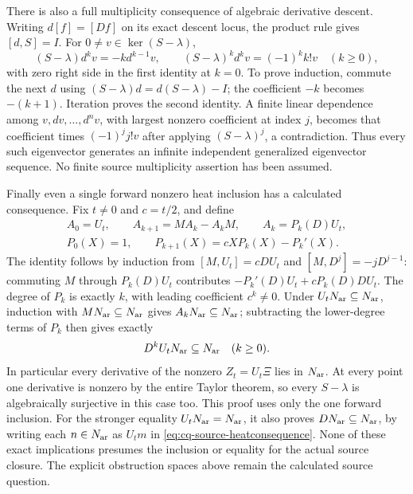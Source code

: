 There is also a full multiplicity consequence of algebraic derivative
descent. Writing $d[f]=[Df]$ on its exact descent locus, the product
rule gives $[d,S]=I$. For $0\ne v\in\ker(S-\lambda)$,
\begin{equation}\label{eq:cq-source-weylladder}
 (S-\lambda)d^kv=-k d^{k-1}v,
 \qquad (S-\lambda)^kd^kv=(-1)^k k!v\quad(k\geq0),
\end{equation}
with zero right side in the first identity at $k=0$.
To prove induction, commute the next $d$ using
$(S-\lambda)d=d(S-\lambda)-I$; the coefficient $-k$ becomes
$-(k+1)$. Iteration proves the second identity. A finite linear
dependence among $v,dv,\ldots,d^nv$, with largest nonzero
coefficient at index $j$, becomes that coefficient times
$(-1)^j j!v$ after applying $(S-\lambda)^j$, a contradiction.
Thus every such eigenvector generates an infinite independent
generalized eigenvector sequence. No finite source multiplicity
assertion has been assumed.

Finally even a single forward nonzero heat inclusion has a calculated
consequence. Fix $t\ne0$ and $c=t/2$, and define
\begin{equation}\label{eq:cq-source-heatcommutator}
 \begin{gathered}
 A_0=U_t,\qquad A_{k+1}=MA_k-A_kM,\qquad A_k=P_k(D)U_t,\\
 P_0(X)=1,\qquad P_{k+1}(X)=cX P_k(X)-P_k'(X).
 \end{gathered}
\end{equation}
The identity follows by induction from $[M,U_t]=cDU_t$ and
$[M,D^j]=-jD^{j-1}$: commuting $M$ through $P_k(D)U_t$
contributes $-P_k'(D)U_t+cP_k(D)DU_t$.
The degree of $P_k$ is exactly $k$, with leading coefficient
$c^k\ne0$. Under $U_tN_{\rm ar}\subseteq N_{\rm ar}$, induction with
$MN_{\rm ar}\subseteq N_{\rm ar}$ gives $A_kN_{\rm ar}\subseteq N_{\rm ar}$;
subtracting the lower-degree terms of $P_k$ then gives exactly
\begin{equation}\label{eq:cq-source-heatconsequence}
 D^kU_tN_{\rm ar}\subseteq N_{\rm ar}\quad(k\geq0).
\end{equation}
In particular every derivative of the nonzero $Z_t=U_t\Xi$ lies
in $N_{\rm ar}$. At every point one derivative is nonzero by the entire
Taylor theorem, so every $S-\lambda$ is algebraically surjective
in this case too. This proof uses only the one forward inclusion.
For the stronger equality $U_tN_{\rm ar}=N_{\rm ar}$, it also proves
$DN_{\rm ar}\subseteq N_{\rm ar}$, by writing each $n\in N_{\rm ar}$ as
$U_tm$ in \eqref{eq:cq-source-heatconsequence}. None of these
exact implications presumes the inclusion or equality for the actual
source closure. The explicit obstruction spaces above remain the
calculated source question.


